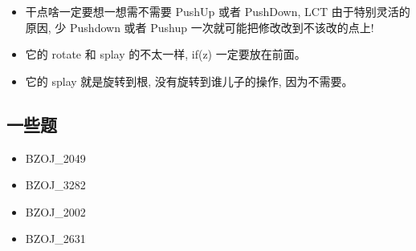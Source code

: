 \begin{itemize}
\item 干点啥一定要想一想需不需要 PushUp 或者 PushDown, LCT 由于特别灵活的原因, 少 Pushdown 或者 Pushup 一次就可能把修改改到不该改的点上!
\item 它的 rotate 和 splay 的不太一样, if(z) 一定要放在前面。
\item 它的 splay 就是旋转到根, 没有旋转到谁儿子的操作, 因为不需要。
\end{itemize}

\subsection{一些题}

\begin{itemize}
\item BZOJ\_2049 
\item BZOJ\_3282
\item BZOJ\_2002
\item BZOJ\_2631
\end{itemize}
